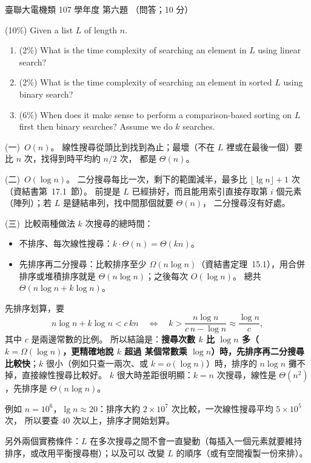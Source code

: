 \begin{pastexam}[label={px:ust-107-ee-ds-06}]{臺聯大電機類 107 學年度 第六題}
（問答；10 分）

(10\%) Given a list $L$ of length $n$.
\begin{enumerate}
\item[(一)] (2\%) What is the time complexity of searching an element in $L$ using linear search?
\item[(二)] (2\%) What is the time complexity of searching an element in sorted $L$ using binary search?
\item[(三)] (6\%) When does it make sense to perform a comparison-based sorting on $L$ first then binary searches? Assume we do $k$ searches.
\end{enumerate}
\end{pastexam}

\begin{pastsoln}
(一)~$O(n)$。 線性搜尋從頭比到找到為止；最壞（不在 $L$ 裡或在最後一個）要比 $n$ 次，找得到時平均約 $n/2$ 次，
都是 $\Theta(n)$。

(二)~$O(\log n)$。 二分搜尋每比一次，剩下的範圍減半，最多比 $\lfloor \lg n \rfloor + 1$ 次（資結書第~17.1~節）。
前提是 $L$ 已經排好，而且能用索引直接存取第 $i$ 個元素（陣列）；若 $L$ 是鏈結串列，找中間那個就要 $\Theta(n)$，
二分搜尋沒有好處。

(三)~比較兩種做法 $k$ 次搜尋的總時間：
\begin{itemize}
\item 不排序、每次線性搜尋：$k \cdot \Theta(n) = \Theta(kn)$。
\item 先排序再二分搜尋：比較排序至少 $\Omega(n \log n)$（資結書定理~15.1），用合併排序或堆積排序就是
$\Theta(n \log n)$；之後每次 $O(\log n)$。 總共 $\Theta(n \log n + k \log n)$。
\end{itemize}
先排序划算，要
\[
n \log n + k \log n < c\, kn
\quad\Longleftrightarrow\quad
k > \frac{n \log n}{c\,n - \log n} \approx \frac{\log n}{c} ,
\]
其中 $c$ 是兩邊常數的比例。 所以結論是：\textbf{搜尋次數 $k$ 比 $\log n$ 多（$k = \Omega(\log n)$，更精確地說 $k$ 超過
某個常數乘 $\log n$）時，先排序再二分搜尋比較快}；$k$ 很小（例如只查一兩次、或 $k = o(\log n)$）時，排序的
$n \log n$ 攤不掉，直接線性搜尋比較好。 $k$ 很大時差距很明顯：$k = n$ 次搜尋，線性是 $\Theta(n^2)$，先排序是
$\Theta(n \log n)$。

例如 $n = 10^6$，$\lg n \approx 20$：排序大約 $2 \times 10^7$ 次比較，一次線性搜尋平均 $5 \times 10^5$ 次，
所以要查 $40$ 次以上，排序才開始划算。

另外兩個實務條件：$L$ 在多次搜尋之間不會一直變動（每插入一個元素就要維持排序，或改用平衡搜尋樹）；以及可以
改變 $L$ 的順序（或有空間複製一份來排）。
\end{pastsoln}
